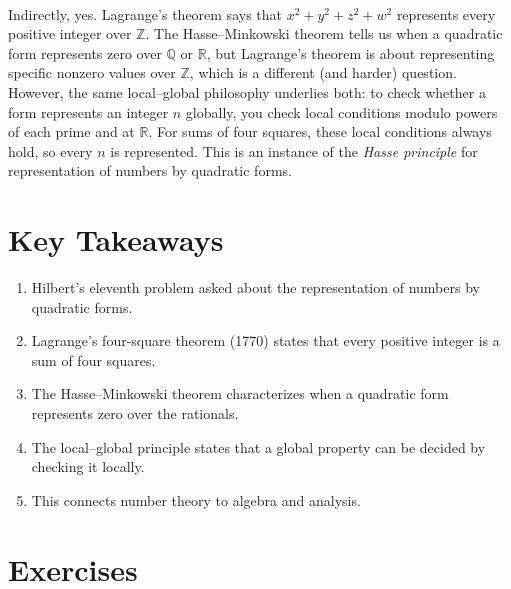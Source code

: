 \begin{description}[font=\bfseries, leftmargin=2em, style=nextline]
\item[Q: Is Lagrange's four-square theorem related to the Hasse--Minkowski theorem?]\hfill\\
Indirectly, yes. Lagrange's theorem says that $x^2 + y^2 + z^2 + w^2$ represents every positive integer over $\mathbb{Z}$. The Hasse--Minkowski theorem tells us when a quadratic form represents zero over $\mathbb{Q}$ or $\mathbb{R}$, but Lagrange's theorem is about representing specific nonzero values over $\mathbb{Z}$, which is a different (and harder) question. However, the same local--global philosophy underlies both: to check whether a form represents an integer $n$ globally, you check local conditions modulo powers of each prime and at $\mathbb{R}$. For sums of four squares, these local conditions always hold, so every $n$ is represented. This is an instance of the \emph{Hasse principle} for representation of numbers by quadratic forms.

\end{description}

\section*{Key Takeaways}

\begin{enumerate}
    \item Hilbert's eleventh problem asked about the representation of numbers by quadratic forms.
    \item Lagrange's four-square theorem (1770) states that every positive integer is a sum of four squares.
    \item The Hasse--Minkowski theorem characterizes when a quadratic form represents zero over the rationals.
    \item The local--global principle states that a global property can be decided by checking it locally.
    \item This connects number theory to algebra and analysis.
\end{enumerate}

\section*{Exercises}

